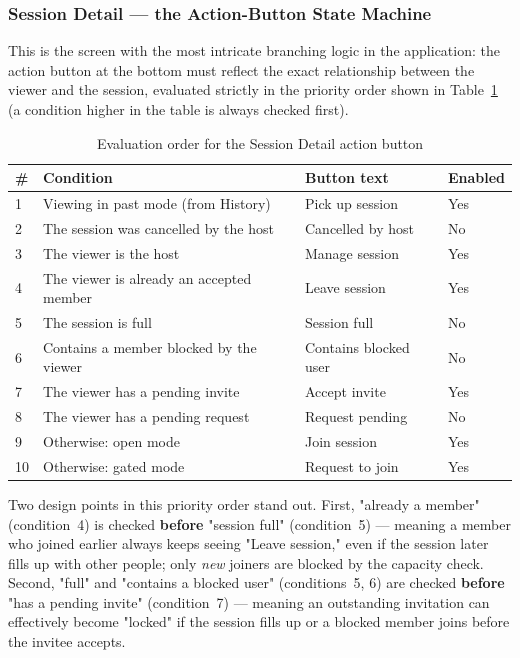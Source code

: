 \subsubsection{Session Detail --- the Action-Button State Machine}
\label{sec:actionmatrix}

This is the screen with the most intricate branching logic in the application: the action button at the bottom must reflect the exact relationship between the viewer and the session, evaluated strictly in the priority order shown in Table~\ref{tab:actionmatrix} (a condition higher in the table is always checked first).

\begin{table}[h]
\centering
\caption{Evaluation order for the Session Detail action button}
\label{tab:actionmatrix}
\begin{tabular}{p{0.7cm}p{4.2cm}p{4cm}p{1.5cm}}
\toprule
\textbf{\#} & \textbf{Condition} & \textbf{Button text} & \textbf{Enabled} \\
\midrule
1 & Viewing in past mode (from History) & Pick up session & Yes \\
2 & The session was cancelled by the host & Cancelled by host & No \\
3 & The viewer is the host & Manage session & Yes \\
4 & The viewer is already an accepted member & Leave session & Yes \\
5 & The session is full & Session full & No \\
6 & Contains a member blocked by the viewer & Contains blocked user & No \\
7 & The viewer has a pending invite & Accept invite & Yes \\
8 & The viewer has a pending request & Request pending & No \\
9 & Otherwise: open mode & Join session & Yes \\
10 & Otherwise: gated mode & Request to join & Yes \\
\bottomrule
\end{tabular}
\end{table}

Two design points in this priority order stand out. First, "already a member" (condition~4) is checked \textbf{before} "session full" (condition~5) — meaning a member who joined earlier always keeps seeing "Leave session," even if the session later fills up with other people; only \emph{new} joiners are blocked by the capacity check. Second, "full" and "contains a blocked user" (conditions~5, 6) are checked \textbf{before} "has a pending invite" (condition~7) — meaning an outstanding invitation can effectively become "locked" if the session fills up or a blocked member joins before the invitee accepts.

